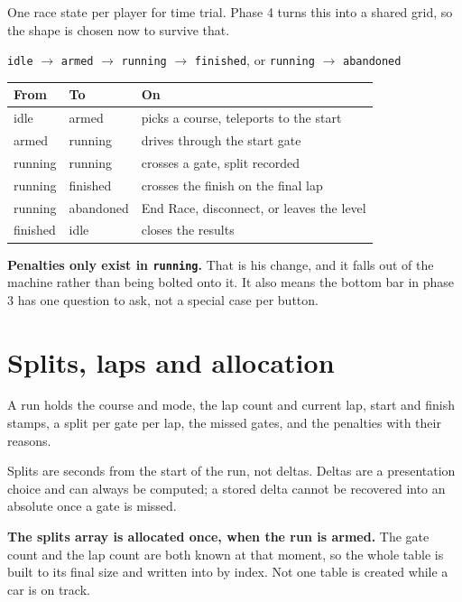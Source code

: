 \documentclass[11pt,a4paper]{article}
\newcommand{\code}[1]{\texttt{\small #1}}
\begin{document}
One race state per player for time trial. Phase 4 turns this into a shared
grid, so the shape is chosen now to survive that.

\begin{center}
\code{idle} $\rightarrow$ \code{armed} $\rightarrow$ \code{running} $\rightarrow$ \code{finished},
\quad or \code{running} $\rightarrow$ \code{abandoned}
\end{center}

\begin{longtable}{@{}lll@{}}
\toprule
\textbf{From} & \textbf{To} & \textbf{On} \\
\midrule
\endhead
idle     & armed     & picks a course, teleports to the start \\
armed    & running   & drives through the start gate \\
running  & running   & crosses a gate, split recorded \\
running  & finished  & crosses the finish on the final lap \\
running  & abandoned & End Race, disconnect, or leaves the level \\
finished & idle      & closes the results \\
\bottomrule
\end{longtable}

\textbf{Penalties only exist in \code{running}.} That is his change, and it
falls out of the machine rather than being bolted onto it. It also means the
bottom bar in phase 3 has one question to ask, not a special case per button.

\section{Splits, laps and allocation}

A run holds the course and mode, the lap count and current lap, start and
finish stamps, a split per gate per lap, the missed gates, and the penalties
with their reasons.

Splits are seconds from the start of the run, not deltas. Deltas are a
presentation choice and can always be computed; a stored delta cannot be
recovered into an absolute once a gate is missed.

\textbf{The splits array is allocated once, when the run is armed.} The gate
count and the lap count are both known at that moment, so the whole table is
built to its final size and written into by index. Not one table is created
while a car is on track.
\end{document}
